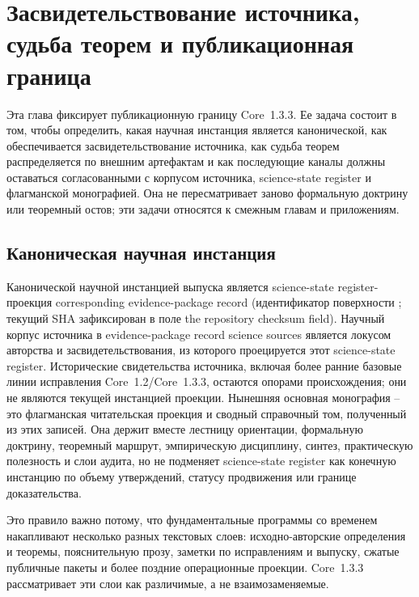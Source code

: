 \section{Засвидетельствование источника, судьба теорем и публикационная граница}
\label{sec:oc13-publication-boundary}

Эта глава фиксирует публикационную границу Core~1.3.3. Ее задача состоит в том,
чтобы определить, какая научная инстанция является канонической, как
обеспечивается засвидетельствование источника, как судьба теорем
распределяется по внешним артефактам и как последующие каналы должны
оставаться согласованными с корпусом источника, science-state register и флагманской
монографией. Она не пересматривает заново формальную доктрину или теоремный
остов; эти задачи относятся к смежным главам и приложениям.

\subsection{Каноническая научная инстанция}

Канонической научной инстанцией выпуска является science-state register-проекция
corresponding evidence-package record
(идентификатор поверхности ; текущий SHA
зафиксирован в поле the repository checksum field). Научный корпус источника в
evidence-package record science sources является локусом
авторства и засвидетельствования, из которого проецируется этот science-state register.
Исторические свидетельства источника, включая более ранние базовые линии
исправления Core~1.2/Core~1.3.3, остаются опорами происхождения; они не являются
текущей инстанцией проекции. Нынешняя основная монография -- это флагманская
читательская проекция и сводный справочный том, полученный из этих записей.
Она держит вместе лестницу ориентации, формальную доктрину, теоремный маршрут,
эмпирическую дисциплину, синтез, практическую полезность и слои аудита, но не
подменяет science-state register как конечную инстанцию по объему утверждений, статусу
продвижения или границе доказательства.

Это правило важно потому, что фундаментальные программы со временем накапливают
несколько разных текстовых слоев: исходно-авторские определения и теоремы,
пояснительную прозу, заметки по исправлениям и выпуску, сжатые публичные пакеты
и более поздние операционные проекции. Core~1.3.3 рассматривает эти слои как
различимые, а не взаимозаменяемые.

